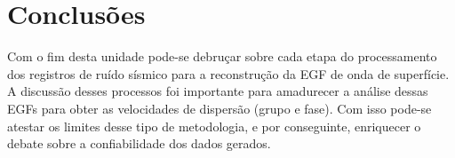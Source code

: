 \documentclass[paper,twocolumn]{geophysics}
\begin{document}
\section*{Conclusões}

Com o fim desta unidade pode-se debruçar sobre cada etapa do processamento dos registros de ruído sísmico para a reconstrução da EGF de onda de superfície. A discussão desses processos foi importante para amadurecer a análise dessas EGFs para obter as velocidades de dispersão (grupo e fase). Com isso pode-se atestar os limites desse tipo de metodologia, e por conseguinte, enriquecer o debate sobre a confiabilidade dos dados gerados.



    
\end{document}

